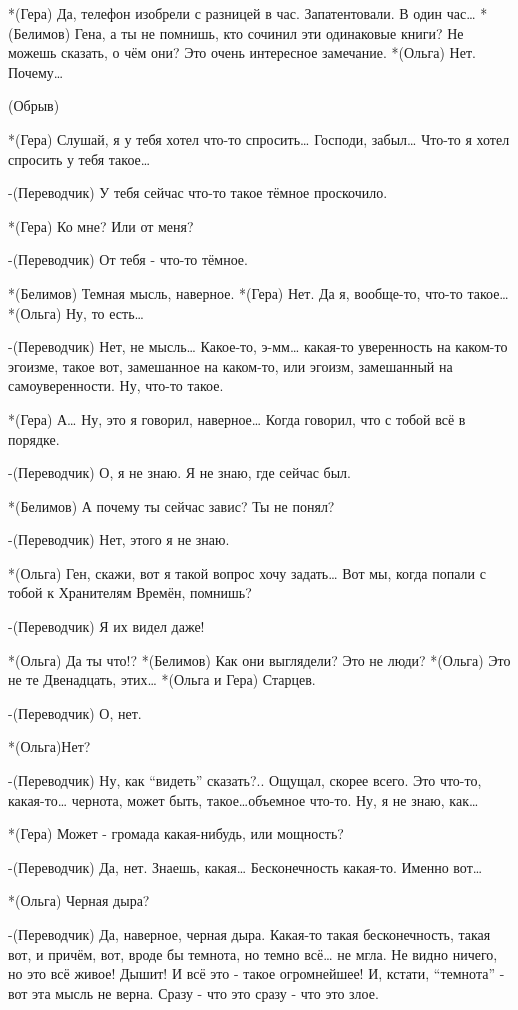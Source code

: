 *(Гера) Да,  телефон изобрели с разницей в час. Запатентовали. В один час…
*(Белимов) Гена, а ты не помнишь, кто сочинил эти одинаковые книги? Не можешь сказать, о чём они? Это очень интересное замечание.
*(Ольга) Нет. Почему…

(Обрыв)

*(Гера) Слушай, я у тебя хотел что-то спросить… Господи, забыл… Что-то я хотел спросить у тебя такое…

-(Переводчик) У тебя сейчас что-то такое тёмное проскочило.

*(Гера) Ко мне? Или от меня?

-(Переводчик) От тебя - что-то тёмное. 

*(Белимов) Темная мысль, наверное.
*(Гера) Нет. Да я, вообще-то, что-то такое…
*(Ольга) Ну, то есть…

-(Переводчик) Нет, не мысль… Какое-то, э-мм… какая-то уверенность  на каком-то эгоизме, такое вот, замешанное на каком-то, или эгоизм, замешанный на самоуверенности. Ну, что-то такое.

*(Гера) А… Ну, это я говорил, наверное…  Когда говорил, что с тобой всё в порядке.

-(Переводчик) О, я не знаю. Я не знаю, где сейчас был.

*(Белимов) А почему ты сейчас завис? Ты не понял?

-(Переводчик) Нет, этого я не знаю.

*(Ольга) Ген, скажи, вот я такой вопрос хочу задать… Вот мы, когда попали с тобой к Хранителям Времён, помнишь?

-(Переводчик) Я их видел даже!

*(Ольга) Да ты что!?
*(Белимов) Как они выглядели? Это не люди?
*(Ольга) Это не те Двенадцать, этих…
*(Ольга и Гера) Старцев.

-(Переводчик) О, нет. 

*(Ольга)Нет?

-(Переводчик) Ну, как “видеть” сказать?.. Ощущал, скорее всего. Это что-то, какая-то… чернота, может быть, такое…объемное что-то. Ну, я не знаю, как… 

*(Гера) Может - громада какая-нибудь,  или мощность?

-(Переводчик) Да, нет. Знаешь, какая… Бесконечность какая-то. Именно вот…

*(Ольга) Черная дыра?

-(Переводчик) Да, наверное, черная дыра. Какая-то такая бесконечность, такая вот, и причём, вот, вроде бы темнота, но темно всё… не мгла. Не видно ничего, но это всё живое! Дышит! И всё это - такое огромнейшее! И, кстати, “темнота” - вот эта мысль не верна. Сразу - что это сразу - что это злое.

